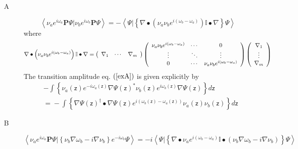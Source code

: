 \documentclass[aps,preprint]{revtex4}%
\begin{document}
\begin{description}
\item[A]
\begin{equation}
\left\langle \nu_{a}e^{i\omega_{a}}\mathbf{P}\Psi|\nu_{b}e^{i\omega_{b}%
}\mathbf{P}\Psi\right\rangle =-\left\langle \Psi|\left\{  \nabla\bullet\left(
\nu_{a}\nu_{b}e^{i\left(  \omega_{b}-\omega_{a}\right)  }\right)
\mathbb{I}\bullet\nabla\right\}  \Psi\right\rangle \label{exA}%
\end{equation}
where
\begin{equation}
\nabla\bullet\left(  \nu_{a}\nu_{b}e^{i\left(  \omega_{b}-\omega_{a}\right)
}\right)  \mathbb{I}\bullet\nabla=\left(
\begin{array}
[c]{ccc}%
\nabla_{1} & \cdots & \nabla_{m}%
\end{array}
\right)  \left(
\begin{array}
[c]{ccc}%
\nu_{a}\nu_{b}e^{i\left(  \omega_{b}-\omega_{a}\right)  } & \cdots & 0\\
\vdots & \ddots & \vdots\\
0 & \cdots & \nu_{a}\nu_{b}e^{i\left(  \omega_{b}-\omega_{a}\right)  }%
\end{array}
\right)  \left(
\begin{array}
[c]{c}%
\nabla_{1}\\
\vdots\\
\nabla_{m}%
\end{array}
\right)
\end{equation}
The transition amplitude eq. $\left(  \ref{exA}\right)  $ is given explicitly
by
\begin{align}
&  -%
{\displaystyle\int}
\left\{  \nu_{a}\left(  \mathsf{z}\right)  e^{-i\omega_{a}\left(
\mathsf{z}\right)  }\nabla\Psi\left(  \mathsf{z}\right)  ^{\ast}\nu_{b}\left(
\mathsf{z}\right)  e^{i\omega_{b}\left(  \mathsf{z}\right)  }\nabla\Psi\left(
\mathsf{z}\right)  \right\}  d\mathsf{z}\nonumber\\
&  \left.  =\right.  -%
{\displaystyle\int}
\left\{  \nabla\Psi\left(  \mathsf{z}\right)  ^{\dagger}\bullet\nabla
\Psi\left(  \mathsf{z}\right)  e^{i\left(  \omega_{b}\left(  \mathsf{z}%
\right)  -\omega_{a}\left(  \mathsf{z}\right)  \right)  }\nu_{a}\left(
\mathsf{z}\right)  \nu_{b}\left(  \mathsf{z}\right)  \right\}  d\mathsf{z}%
\end{align}


\item[B]
\begin{equation}
\left\langle \nu_{a}e^{i\omega_{a}}\mathbf{P}\Psi|\left\{  \nu_{b}\nabla
\omega_{b}-i\nabla\nu_{b}\right\}  e^{-i\omega_{b}}\Psi\right\rangle
=-i\left\langle \Psi|\left\{  \nabla\bullet\nu_{a}e^{i\left(  \omega
_{b}-\omega_{a}\right)  }\mathbb{I}\bullet\left(  \nu_{b}\nabla\omega
_{b}-i\nabla\nu_{b}\right)  \right\}  \Psi\right\rangle
\end{equation}



\end{description}
\end{document}
